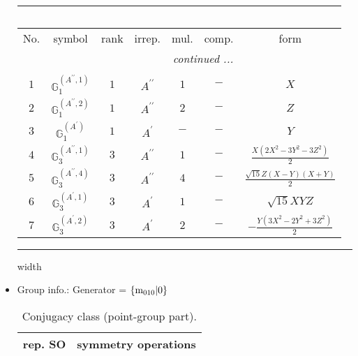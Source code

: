 \documentclass[fleqn,10pt,landscape]{article}
\begin{document}
\begin{itemize}
\begin{center}
\begin{longtable}{ccccccc}
\multicolumn{6}{l}{\tablename\ \thetable{}} \\
 \hline \hline
No. & symbol & rank & irrep. & mul. & comp. & form \\ \hline \endhead

 \hline \hline
\multicolumn{6}{r}{\footnotesize\it continued ...} \\ \endfoot

 \hline \hline
\multicolumn{6}{r}{} \\ \endlastfoot

$ 1 $ & $ \mathbb{G}_{1}^{(A^{\prime\prime},1)} $ & $ 1 $ & $ A^{\prime\prime} $ & $ 1 $ & $ - $ & $ X $ \\
$ 2 $ & $ \mathbb{G}_{1}^{(A^{\prime\prime},2)} $ & $ 1 $ & $ A^{\prime\prime} $ & $ 2 $ & $ - $ & $ Z $ \\
$ 3 $ & $ \mathbb{G}_{1}^{(A^{\prime})} $ & $ 1 $ & $ A^{\prime} $ & $ - $ & $ - $ & $ Y $ \\ \hline
$ 4 $ & $ \mathbb{G}_{3}^{(A^{\prime\prime},1)} $ & $ 3 $ & $ A^{\prime\prime} $ & $ 1 $ & $ - $ & $ \frac{X \left(2 X^{2} - 3 Y^{2} - 3 Z^{2}\right)}{2} $ \\
$ 5 $ & $ \mathbb{G}_{3}^{(A^{\prime\prime},4)} $ & $ 3 $ & $ A^{\prime\prime} $ & $ 4 $ & $ - $ & $ \frac{\sqrt{15} Z \left(X - Y\right) \left(X + Y\right)}{2} $ \\
$ 6 $ & $ \mathbb{G}_{3}^{(A^{\prime},1)} $ & $ 3 $ & $ A^{\prime} $ & $ 1 $ & $ - $ & $ \sqrt{15} X Y Z $ \\
$ 7 $ & $ \mathbb{G}_{3}^{(A^{\prime},2)} $ & $ 3 $ & $ A^{\prime} $ & $ 2 $ & $ - $ & $ - \frac{Y \left(3 X^{2} - 2 Y^{2} + 3 Z^{2}\right)}{2} $ \\
\end{longtable}
\end{center}

 \hfil \hrule height 1mm width \textwidth \hfil

\item Group info.: Generator = $\{{\rm m}_{010}|0\}$

\begin{center}
\renewcommand{\arraystretch}{1.3}
\begin{longtable}{c|l}
\caption{Conjugacy class (point-group part).}
 \\
 \hline \hline
rep. SO & symmetry operations \\ \hline \endfirsthead


\end{longtable}
\end{center}
\end{itemize}
\end{document}
